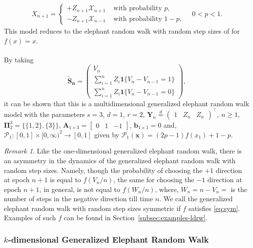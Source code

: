 \documentclass[12pt]{amsart}
\theoremstyle{plain}
\theoremstyle{remark}
\newtheorem{remark}[theorem]{Remark}
\numberwithin{equation}{section}
\begin{document}
\begin{align*}
   X_{n+1} = \begin{cases} +Z_{n+1}\mathcal{X}_{n+1} &\text{ with probability } p, \\ -Z_{n+1}\mathcal{X}_{n-1}
   &\text{ with probability } 1-p, \end{cases} \quad 0 < p < 1.
\end{align*}
This model reduces to the elephant random walk with random step sizes of \cite{erwrs1} for $f(x) = x$. \\\\
By taking \[\boldsymbol{\widetilde{S}_n} = \begin{pmatrix}
    V_n \\ \sum_{i=1}^nZ_i\boldsymbol{1}\{V_n - V_{n-1} = 1\} \\ \sum_{i=1}^nZ_i\boldsymbol{1}\{V_n - V_{n-1} = 0\} 
\end{pmatrix},\] it can be shown that this is a multidimensional generalized elephant random walk model with the parameters $s = 3$, $d = 1$, $r = 2$, $\boldsymbol{Y}_n \stackrel{d}{=} \begin{pmatrix}1 & Z_n & Z_n\end{pmatrix}^{\top}$, $n\geq 1$, $\boldsymbol{\Pi}^3_2 = \{\{1,2\}, \{3\}\}$, $\boldsymbol{A}_{1\times 3} = \begin{bmatrix} 0 & 1 & -1\end{bmatrix}$, $\boldsymbol{b}_{1\times 1} = 0$ and, ${\mathcal{P}}_1 : [0,1]\times[0,\infty)^2 \to [0,1]$ given by $\mathcal{P}_1(\boldsymbol{x}) = (2p-1)f(x_1) + 1-p$.

\begin{remark}
Like the one-dimensional generalized elephant random walk, there is an asymmetry in the dynamics of the generalized elephant random walk with random step sizes. Namely, though the probability of choosing the $+1$ direction at epoch $n + 1$ is equal to $f(V_n/n)$, the same for choosing the $-1$ direction at epoch $n + 1$, in general, is not equal to $f(W_n/n)$, where, $W_n = n - V_n = $ is the number of steps in the negative direction till time $n$. We call the generalized elephant random walk with random step sizes symmetric if $f$ satisfies \eqref{eq:sym}. Examples of such $f$ can be found in Section~\ref{subsec:examples-ldrw}.     
\end{remark}

\subsubsection{$k$-dimensional Generalized Elephant Random Walk}\label{eg:gmerw}
\end{document}
